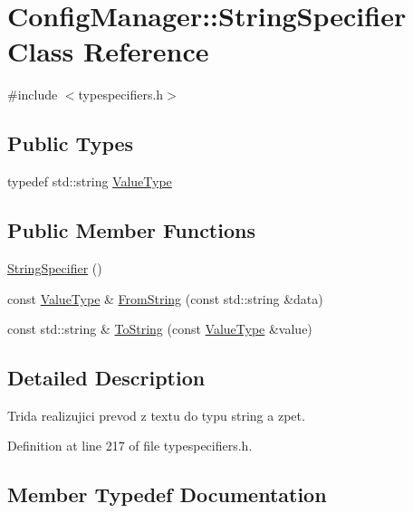 \hypertarget{class_config_manager_1_1_string_specifier}{}\section{Config\+Manager\+:\+:String\+Specifier Class Reference}
\label{class_config_manager_1_1_string_specifier}


{\ttfamily \#include $<$typespecifiers.\+h$>$}

\subsection*{Public Types}
\begin{DoxyCompactItemize}
\item 
typedef std\+::string \hyperlink{class_config_manager_1_1_string_specifier_ac4bc384955f5da1874779f02c4ff757f}{Value\+Type}
\end{DoxyCompactItemize}
\subsection*{Public Member Functions}
\begin{DoxyCompactItemize}
\item 
\hyperlink{class_config_manager_1_1_string_specifier_a430e783d95729964c8a9a8755146805d}{String\+Specifier} ()
\item 
const \hyperlink{class_config_manager_1_1_string_specifier_ac4bc384955f5da1874779f02c4ff757f}{Value\+Type} \& \hyperlink{class_config_manager_1_1_string_specifier_aced30df1ae4ec0922f3fd87a98b4ca65}{From\+String} (const std\+::string \&data)
\item 
const std\+::string \& \hyperlink{class_config_manager_1_1_string_specifier_a86ad1a911411e7189c55056f7369355d}{To\+String} (const \hyperlink{class_config_manager_1_1_string_specifier_ac4bc384955f5da1874779f02c4ff757f}{Value\+Type} \&value)
\end{DoxyCompactItemize}


\subsection{Detailed Description}
Trida realizujici prevod z textu do typu string a zpet. 

Definition at line 217 of file typespecifiers.\+h.



\subsection{Member Typedef Documentation}
